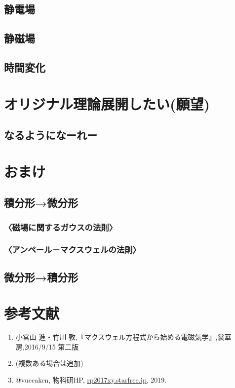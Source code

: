 \documentclass[10pt,b5paper,papersize,dvipdfmx]{jsbook}
\begin{document}
\subsection{静電場}

\subsection{静磁場}
\subsection{時間変化}
\subsection{}

\section{オリジナル理論展開したい(願望)}
\subsection{なるようになーれー}

\section{おまけ}
\subsection{積分形→微分形}
\subsubsection{〈磁場に関するガウスの法則〉}

\subsubsection{〈アンペール－マクスウェルの法則〉}

\subsection{微分形→積分形}


\section{参考文献}
\renewcommand{\labelenumi}{[\arabic{enumi}]} %
\begin{enumerate}
\item 小宮山 進・竹川 敦,『マクスウェル方程式から始める電磁気学』,裳華房,2016/9/15 第二版
\item (複数ある場合は追加)
\item @vuccaken, 物科研HP, \url{rp2017xy.starfree.jp}, 2019.
\end{enumerate}
\renewcommand{\labelenumi}{\arabic{enumi}.} %
\end{document}
